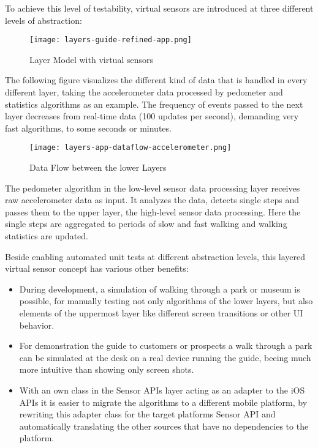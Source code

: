 To achieve this level of testability, virtual sensors are introduced at three different levels of abstraction:
 
\begin{figure}[H]
\centering
\texttt{[image: layers-guide-refined-app.png]}
\caption{Layer Model with virtual sensors}
\end{figure}

The following figure visualizes the different kind of data that is handled in every different layer, taking the accelerometer data processed by pedometer and statistics algorithms as an example. The frequency of events passed to the next layer decreases from real-time data (100 updates per second), demanding very fast algorithms, to some seconds or minutes.

\begin{figure}[H]
\centering
\texttt{[image: layers-app-dataflow-accelerometer.png]}
\caption{Data Flow between the lower Layers}
\end{figure}

The pedometer algorithm in the low-level sensor data processing layer receives raw accelerometer data as input. It analyzes the data, detects single steps and passes them to the upper layer, the high-level sensor data processing. Here the single steps are aggregated to periods of slow and fast walking and walking statistics are updated.

Beside enabling automated unit tests at different abstraction levels, this layered virtual sensor concept has various other benefits:

\begin{itemize}
\item During development, a simulation of walking through a park or museum is possible, for manually testing not only algorithms of the lower layers, but also elements of the uppermost layer like different screen transitions or other UI behavior.
\item For demonstration the guide to customers or prospects a walk through a park can be simulated at the desk on a real device running the guide, beeing much more intuitive than showing only screen shots.
\item With an own class in the Sensor APIs layer acting as an adapter to the iOS APIs it is easier to migrate the algorithms to a different mobile platform, by rewriting this adapter class for the target platforms Sensor API and automatically translating the other sources that have no dependencies to the platform.
\end{itemize}



